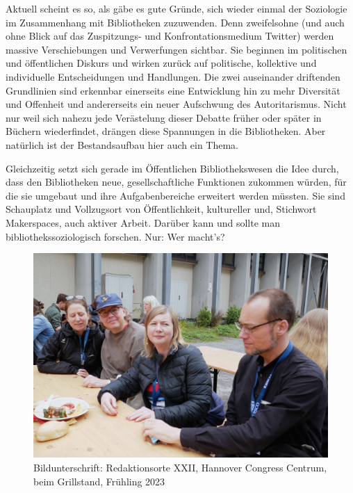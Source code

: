 \documentclass[a4paper,
fontsize=11pt,
oneside,
numbers=noperiodatend,
parskip=half-,
bibliography=totoc,
final
]{scrartcl}
\begin{document}
Aktuell scheint es so, als gäbe es gute Gründe, sich wieder einmal der
Soziologie im Zusammenhang mit Bibliotheken zuzuwenden. Denn
zweifelsohne (und auch ohne Blick auf das Zuspitzungs- und
Konfrontationsmedium Twitter) werden massive Verschiebungen und
Verwerfungen sichtbar. Sie beginnen im politischen und öffentlichen
Diskurs und wirken zurück auf politische, kollektive und individuelle
Entscheidungen und Handlungen. Die zwei auseinander driftenden
Grundlinien sind erkennbar einerseits eine Entwicklung hin zu mehr
Diversität und Offenheit und andererseits ein neuer Aufschwung des
Autoritarismus. Nicht nur weil sich nahezu jede Verästelung dieser
Debatte früher oder später in Büchern wiederfindet, drängen diese
Spannungen in die Bibliotheken. Aber natürlich ist der Bestandsaufbau
hier auch ein Thema.

Gleichzeitig setzt sich gerade im Öffentlichen Bibliothekswesen die Idee
durch, dass den Bibliotheken neue, gesellschaftliche Funktionen zukommen
würden, für die sie umgebaut und ihre Aufgabenbereiche erweitert werden
müssten. Sie sind Schauplatz und Vollzugsort von Öffentlichkeit,
kultureller und, Stichwort Makerspaces, auch aktiver Arbeit. Darüber
kann und sollte man bibliothekssoziologisch forschen. Nur: Wer macht's?

\begin{figure}
\centering
\includegraphics{editorial.jpg}
\caption{Bildunterschrift: Redaktionsorte XXII, Hannover Congress
Centrum, beim Grillstand, Frühling 2023}
\end{figure}
\end{document}
